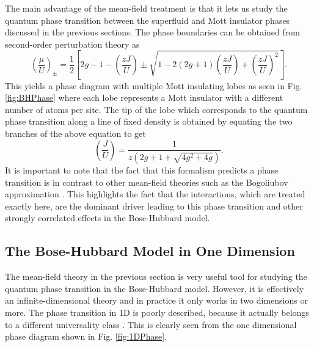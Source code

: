 The main advantage of the mean-field treatment is that it lets us
study the quantum phase transition between the superfluid and Mott
insulator phases discussed in the previous sections. The phase
boundaries can be obtained from second-order perturbation theory as 
\begin{equation}
  \left( \frac{\mu} {U} \right)_\pm = \frac{1}{2} \left[ 2g - 1 -
    \left( \frac{zJ}{U} \right) \pm \sqrt{ 1 - 2 (2g + 1) \left( \frac{zJ}{U}
        \right) + \left( \frac{zJ}{U} \right)^2} \right].
\end{equation}
This yields a phase diagram with multiple Mott insulating lobes as
seen in Fig. \ref{fig:BHPhase} where each lobe represents a Mott
insulator with a different number of atoms per site. The tip of the
lobe which corresponds to the quantum phase transition along a line of
fixed density is obtained by equating the two branches of the above
equation to get
\begin{equation}
  \left( \frac{J} {U} \right) = \frac{1} {z (2g + 1 + \sqrt{4g^2 + 4g} )}.
\end{equation}
It is important to note that the fact that this formalism predicts a
phase transition is in contrast to other mean-field theories such as
the Bogoliubov approximation \cite{PitaevskiiStringari}. This
highlights the fact that the interactions, which are treated exactly
here, are the dominant driver leading to this phase transition and
other strongly correlated effects in the Bose-Hubbard model.

\subsection{The Bose-Hubbard Model in One Dimension}
\label{sec:BHM1D}

The mean-field theory in the previous section is very useful tool for
studying the quantum phase transition in the Bose-Hubbard
model. However, it is effectively an infinite-dimensional theory and
in practice it only works in two dimensions or more. The phase
transition in 1D is poorly described, because it actually belongs to a
different universality class \cite{cazalilla2011, ejima2011,
  kuhner2000, pino2012, pino2013}. This is clearly seen from the one
dimensional phase diagram shown in Fig. \ref{fig:1DPhase}.

